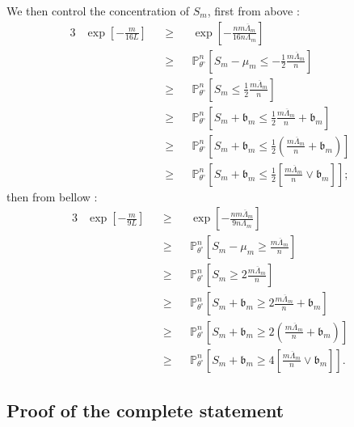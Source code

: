 We then control the concentration of $S_{m}$, first from above :
\begin{alignat*}{3}
& \exp\left[- \frac{m}{16 L}\right] && \geq && \exp\left[- \frac{n m \overline{\Lambda}_{m}}{16 n \Lambda_{m}}\right]\\
& && \geq && \mathds{P}_{\theta^{\circ}}^{n}\left[S_{m} - \mu_{m} \leq -\frac{1}{2} \frac{m \overline{\Lambda}_{m}}{n}\right]\\
& && \geq && \mathds{P}_{\theta^{\circ}}^{n}\left[S_{m} \leq \frac{1}{2} \frac{m \overline{\Lambda}_{m}}{n}\right]\\
& && \geq && \mathds{P}_{\theta^{\circ}}^{n}\left[S_{m} + \mathfrak{b}_{m} \leq \frac{1}{2} \frac{m \overline{\Lambda}_{m}}{n} + \mathfrak{b}_{m} \right]\\
& && \geq && \mathds{P}_{\theta^{\circ}}^{n}\left[S_{m} + \mathfrak{b}_{m} \leq \frac{1}{2} \left(\frac{m \overline{\Lambda}_{m}}{n} + \mathfrak{b}_{m}\right) \right]\\
& && \geq && \mathds{P}_{\theta^{\circ}}^{n}\left[S_{m} + \mathfrak{b}_{m} \leq \frac{1}{2} \left[\frac{m \overline{\Lambda}_{m}}{n} \vee \mathfrak{b}_{m}\right] \right] ;
\end{alignat*}
then from bellow :
\begin{alignat*}{3}
& \exp\left[- \frac{m}{9 L}\right] && \geq && \exp\left[- \frac{n m \overline{\Lambda}_{m}}{9 n \Lambda_{m}}\right]\\
& && \geq && \mathds{P}_{\theta^{\circ}}^{n}\left[S_{m} - \mu_{m} \geq \frac{ m \overline{\Lambda}_{m}}{n}\right]\\
& && \geq && \mathds{P}_{\theta^{\circ}}^{n}\left[S_{m} \geq 2 \frac{m \overline{\Lambda}_{m}}{n}\right]\\
& && \geq && \mathds{P}_{\theta^{\circ}}^{n}\left[S_{m} + \mathfrak{b}_{m} \geq 2 \frac{m \overline{\Lambda}_{m}}{n} + \mathfrak{b}_{m} \right]\\
& && \geq && \mathds{P}_{\theta^{\circ}}^{n}\left[S_{m} + \mathfrak{b}_{m} \geq 2 \left(\frac{m \overline{\Lambda}_{m}}{n} + \mathfrak{b}_{m}\right) \right]\\
& && \geq && \mathds{P}_{\theta^{\circ}}^{n}\left[S_{m} + \mathfrak{b}_{m} \geq 4 \left[\frac{m \overline{\Lambda}_{m}}{n} \vee \mathfrak{b}_{m}\right] \right].
\end{alignat*}

\subsection{Proof of the complete statement}

